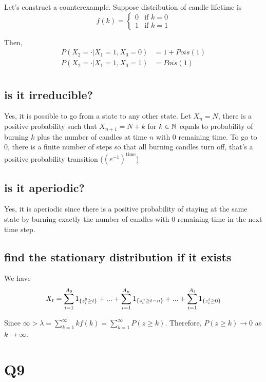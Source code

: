 \documentclass{article}
\begin{document}
Let's construct a counterexample. Suppose distribution of candle lifetime is
$$
    f(k) = \begin{cases}
        0 &\text{if $k = 0$} \\
        1 &\text{if $k = 1$}
    \end{cases}
$$

Then, 
\begin{align*}
    P(X_2 = \cdot | X_1 = 1, X_0 = 0) &= 1 + Pois(1) \\
    P(X_2 = \cdot | X_1 = 1, X_0 = 1) &= Pois(1) \\
\end{align*}

\subsection{is it irreducible?} 

Yes, it is possible to go from a state to any other state. Let $X_n = N$, there is a positive probability such that $X_{n+1} = N + k$ for $k \in \mathbb{N}$ equals to probability of burning $k$ plus the number of candles at time $n$ with $0$ remaining time. To go to $0$, there is a finite number of steps so that all burning candles turn off, that's a positive probability transition ($(e^{-1})^{\text{time}}$)

\subsection{is it aperiodic?}

Yes, it is aperiodic since there is a positive probability of staying at the same state by burning exactly the number of candles with $0$ remaining time in the next time step.

\subsection{find the stationary distribution if it exists}

We have
$$
X_t = \sum_{i=1}^{A_0} 1_{\{z_i^0 \geq t\}} + ... + \sum_{i=1}^{A_n} 1_{\{z_i^n \geq t-n\}} + ... + \sum_{i=1}^{A_t} 1_{\{z_i^t \geq 0\}}
$$

Since $\infty > \lambda = \sum_{k=1}^\infty kf(k) = \sum_{k=1}^\infty P(z \geq k)$. Therefore, $P(z \geq k) \to 0$ as $k \to \infty$.  




\section{Q9}
\end{document}
